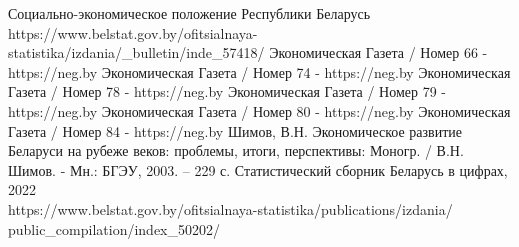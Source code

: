 \documentclass[14pt,a4paper]{article}
\begin{document}
\begin{center}
\begin{thebibliography}{10}
             Социально-экономическое положение Республики Беларусь
            \\
            https://www.belstat.gov.by/ofitsialnaya-statistika/izdania/\_bulletin/inde\_57418/
             Экономическая Газета / Номер 66 - https://neg.by
             Экономическая Газета / Номер 74 - https://neg.by
             Экономическая Газета / Номер 78 - https://neg.by
             Экономическая Газета / Номер 79 - https://neg.by
             Экономическая Газета / Номер 80 - https://neg.by
             Экономическая Газета / Номер 84 - https://neg.by
             Шимов, В.Н. Экономическое развитие Беларуси на рубеже веков: проблемы, итоги, перспективы: Моногр. / В.Н. Шимов. - Мн.: БГЭУ, 2003. – 229 с.
             Статистический сборник Беларусь в цифрах, 2022
            \\
            https://www.belstat.gov.by/ofitsialnaya-statistika/publications/izdania/
            \\
            public\_compilation/index\_50202/
        \end{thebibliography}
    \end{center}
\end{document}
